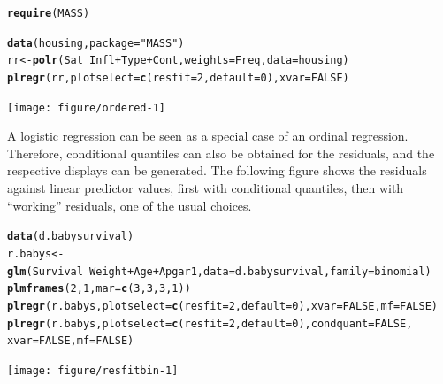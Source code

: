 \documentclass[11pt]{article}\usepackage[]{graphicx}\usepackage[]{color}
\makeatletter
\newcommand{\hlnum}[1]{\textcolor[rgb]{0.686,0.059,0.569}{#1}}%
\newcommand{\hlstr}[1]{\textcolor[rgb]{0.192,0.494,0.8}{#1}}%
\newcommand{\hlopt}[1]{\textcolor[rgb]{0,0,0}{#1}}%
\newcommand{\hlstd}[1]{\textcolor[rgb]{0.345,0.345,0.345}{#1}}%
\newcommand{\hlkwb}[1]{\textcolor[rgb]{0.69,0.353,0.396}{#1}}%
\newcommand{\hlkwc}[1]{\textcolor[rgb]{0.333,0.667,0.333}{#1}}%
\newcommand{\hlkwd}[1]{\textcolor[rgb]{0.737,0.353,0.396}{\textbf{#1}}}%
\newenvironment{kframe}{%
 \def\at@end@of@kframe{}%
 \ifinner\ifhmode%
  \def\at@end@of@kframe{\end{minipage}}%
  \begin{minipage}{\columnwidth}%
 \fi\fi%
 \def\FrameCommand##1{\hskip\@totalleftmargin \hskip-\fboxsep
 \colorbox{shadecolor}{##1}\hskip-\fboxsep
     \hskip-\linewidth \hskip-\@totalleftmargin \hskip\columnwidth}%
 \MakeFramed {\advance\hsize-\width
   \@totalleftmargin\z@ \linewidth\hsize
   \@setminipage}}%
 {\par\unskip\endMakeFramed%
 \at@end@of@kframe}
\newenvironment{knitrout}{}{} %
\makeatother
\begin{document}
\begin{knitrout}
\color{fgcolor}\begin{kframe}
\begin{alltt}
\hlkwd{require}\hlstd{(MASS)}
\end{alltt}


{\ttfamily\noindent\itshape\color{messagecolor}{\#\# Loading required package: MASS}}\begin{alltt}
\hlkwd{data}\hlstd{(housing,} \hlkwc{package}\hlstd{=}\hlstr{"MASS"}\hlstd{)}
\hlstd{rr} \hlkwb{<-} \hlkwd{polr}\hlstd{(Sat} \hlopt{~} \hlstd{Infl} \hlopt{+} \hlstd{Type} \hlopt{+} \hlstd{Cont,} \hlkwc{weights} \hlstd{= Freq,} \hlkwc{data} \hlstd{= housing)}
\hlkwd{plregr}\hlstd{(rr,} \hlkwc{plotselect}\hlstd{=}\hlkwd{c}\hlstd{(}\hlkwc{resfit}\hlstd{=}\hlnum{2}\hlstd{,} \hlkwc{default}\hlstd{=}\hlnum{0}\hlstd{),} \hlkwc{xvar}\hlstd{=}\hlnum{FALSE}\hlstd{)}
\end{alltt}


{\ttfamily\noindent\itshape\color{messagecolor}{\#\# \\\#\# Re-fitting to get Hessian}}\end{kframe}
\texttt{[image: figure/ordered-1]} 

\end{knitrout}

A logistic regression can be seen as a special case of an ordinal regression.
Therefore, conditional quantiles can also be obtained for the residuals,
and the respective displays can be generated.
The following figure shows the residuals against linear predictor values,
first with conditional quantiles, then with ``working'' residuals,
one of the usual choices.

\begin{knitrout}
\color{fgcolor}\begin{kframe}
\begin{alltt}
  \hlkwd{data}\hlstd{(d.babysurvival)}
  \hlstd{r.babys} \hlkwb{<-} \hlkwd{glm}\hlstd{(Survival}\hlopt{~}\hlstd{Weight}\hlopt{+}\hlstd{Age}\hlopt{+}\hlstd{Apgar1,}\hlkwc{data}\hlstd{=d.babysurvival,}\hlkwc{family}\hlstd{=binomial)}
  \hlkwd{plmframes}\hlstd{(}\hlnum{2}\hlstd{,}\hlnum{1}\hlstd{,} \hlkwc{mar}\hlstd{=}\hlkwd{c}\hlstd{(}\hlnum{3}\hlstd{,}\hlnum{3}\hlstd{,}\hlnum{3}\hlstd{,}\hlnum{1}\hlstd{))}
  \hlkwd{plregr}\hlstd{(r.babys,} \hlkwc{plotselect}\hlstd{=}\hlkwd{c}\hlstd{(}\hlkwc{resfit}\hlstd{=}\hlnum{2}\hlstd{,} \hlkwc{default}\hlstd{=}\hlnum{0}\hlstd{),} \hlkwc{xvar}\hlstd{=}\hlnum{FALSE}\hlstd{,} \hlkwc{mf}\hlstd{=}\hlnum{FALSE}\hlstd{)}
  \hlkwd{plregr}\hlstd{(r.babys,} \hlkwc{plotselect}\hlstd{=}\hlkwd{c}\hlstd{(}\hlkwc{resfit}\hlstd{=}\hlnum{2}\hlstd{,} \hlkwc{default}\hlstd{=}\hlnum{0}\hlstd{),} \hlkwc{condquant}\hlstd{=}\hlnum{FALSE}\hlstd{,}
            \hlkwc{xvar}\hlstd{=}\hlnum{FALSE}\hlstd{,} \hlkwc{mf}\hlstd{=}\hlnum{FALSE}\hlstd{)}
\end{alltt}
\end{kframe}
\texttt{[image: figure/resfitbin-1]} 

\end{knitrout}
\end{document}
